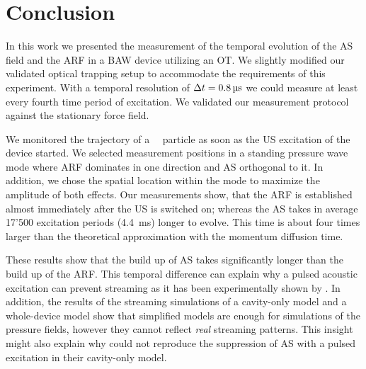 \section{Conclusion\label{sec:TC-conclusion}}

In this work we presented the measurement of the temporal evolution of the AS 
field and the ARF in a BAW device utilizing an OT. We slightly modified our 
validated optical trapping setup \cite{Lamprecht2016,Lamprecht2021} to 
accommodate the requirements of this experiment. With a temporal resolution of 
$\Dt=\SI{0.8}{\us}$ we could measure at least every fourth time period of 
excitation. We validated our measurement protocol against the stationary force 
field.

We monitored the trajectory of a \Dtwo~\SiO~particle as soon as the US 
excitation of the device started. We selected measurement positions in a 
standing pressure wave mode where ARF dominates in one direction and AS 
orthogonal to it. In addition, we chose the spatial location within the mode 
to maximize the amplitude of both effects. Our measurements show, that the ARF 
is established almost immediately after the US is switched on; whereas the AS 
takes in average 17'500 excitation periods (\SI{4.4}{\ms}) longer to evolve. 
This time is about four times larger than the theoretical approximation with 
the momentum diffusion time.

These results show that the build up of AS takes significantly longer than the 
build up of the ARF. This temporal difference can explain why a pulsed acoustic 
excitation can prevent streaming as it has been experimentally shown by 
\citeauthor{Hoyos2013} \cite{Hoyos2013,Castro2016}. In addition, the results of 
the streaming simulations of a cavity-only model and a whole-device model show 
that simplified models are enough for simulations of the pressure fields, 
however they cannot reflect \emph{real} streaming patterns. This insight might 
also explain why \citeauthor{Muller2015} could not reproduce the suppression of 
AS with a pulsed excitation in their cavity-only model.
